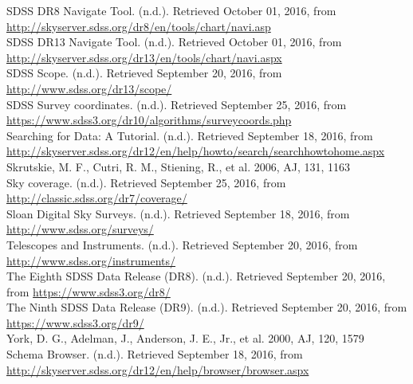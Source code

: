 \documentclass[10pt,letterpaper]{article}
\begin{document}
\begin{thebibliography}{1}
 SDSS DR8 Navigate Tool. (n.d.). Retrieved October 01, 2016, from \url{http://skyserver.sdss.org/dr8/en/tools/chart/navi.asp}\\

 SDSS DR13 Navigate Tool. (n.d.). Retrieved October 01, 2016, from \url{http://skyserver.sdss.org/dr13/en/tools/chart/navi.aspx}\\

 SDSS Scope. (n.d.). Retrieved September 20, 2016, from \url{http://www.sdss.org/dr13/scope/}\\

 SDSS Survey coordinates. (n.d.). Retrieved September 25, 2016, from \url{https://www.sdss3.org/dr10/algorithms/surveycoords.php}\\

 Searching for Data: A Tutorial. (n.d.). Retrieved September 18, 2016, from \url{http://skyserver.sdss.org/dr12/en/help/howto/search/searchhowtohome.aspx}\\

 Skrutskie, M. F., Cutri, R. M., Stiening, R., et al. 2006, AJ, 131, 1163\\

 Sky coverage. (n.d.). Retrieved September 25, 2016, from \url{http://classic.sdss.org/dr7/coverage/}\\

 Sloan Digital Sky Surveys. (n.d.). Retrieved September 18, 2016, from \url{http://www.sdss.org/surveys/}\\

 Telescopes and Instruments. (n.d.). Retrieved September 20, 2016, from \url{http://www.sdss.org/instruments/}\\

 The Eighth SDSS Data Release (DR8). (n.d.). Retrieved September 20, 2016, from \url{https://www.sdss3.org/dr8/}\\

 The Ninth SDSS Data Release (DR9). (n.d.). Retrieved September 20, 2016, from \url{https://www.sdss3.org/dr9/}\\

 York, D. G., Adelman, J., Anderson, J. E., Jr., et al. 2000, AJ, 120, 1579\\

 Schema Browser. (n.d.). Retrieved September 18, 2016, from \url{http://skyserver.sdss.org/dr12/en/help/browser/browser.aspx}\\

\end{thebibliography}
\end{document}
